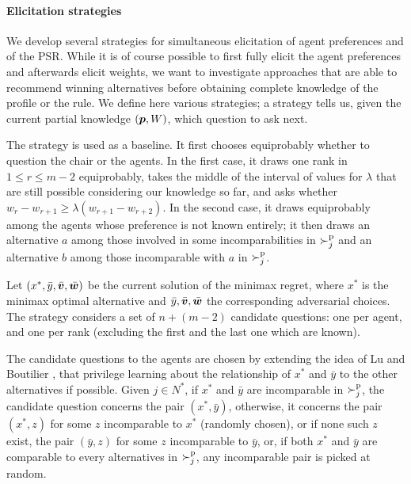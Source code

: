 \documentclass[runningheads]{llncs}
\theoremstyle{remark}
\begin{document}
\paragraph{Elicitation strategies}
We develop several strategies for simultaneous elicitation of agent preferences and of the PSR.
While it is of course possible to first fully elicit the agent preferences and afterwards elicit weights, we want to investigate approaches that are able to recommend winning alternatives before obtaining complete knowledge of the profile or the rule.
We define here various strategies; %
a strategy tells us, given the current partial knowledge $({\bm{p}}, W)$, which question to ask next.

The  strategy is used as a baseline. %
It first chooses equiprobably whether to question the chair or the agents. In the first case, it draws one rank in $1 ≤ r ≤ m-2$ equiprobably, takes the middle of the interval of values for $\lambda$ that are still possible considering our knowledge so far, and asks whether $w_r - w_{r+1} ≥ \lambda (w_{r+1} - w_{r+2})$.
In the second case, it draws equiprobably among the agents whose preference is not known entirely; it then draws an alternative $a$ among those involved in some incomparabilities in $\succ^\text{p}_j$ and an alternative $b$ among those incomparable with $a$ in $\succ^\text{p}_j$.

Let $(x^{*},\bar{y}, \bar{\bm{v}}, \bar{\bm{w}})$ be the current solution of the minimax regret, where $x^{*}$ is the minimax optimal alternative and $\bar{y}, \bar{\bm{v}}, \bar{\bm{w}}$ the corresponding adversarial choices. 
The  strategy considers a set of $n + (m-2)$ candidate questions: one per agent, and one per rank (excluding the first and the last one which are known).

The candidate questions to the agents are chosen by extending the idea of Lu and Boutilier \cite{Lu2011}, that privilege learning about the relationship of $x^*$ and $\bar{y}$ to the other alternatives if possible.
Given $j \in N^*$, if $x^*$ and $\bar{y}$ are incomparable in $\succ^\text{p}_j$, the candidate question concerns the pair $(x^*, \bar{y})$, otherwise, %
it concerns the pair $(x^*, z)$ for some $z$ incomparable to $x^*$ (randomly chosen), or if none such $z$ exist, the pair $(\bar{y}, z)$ for some $z$ incomparable to $\bar{y}$, or, if both $x^*$ and $\bar{y}$ are comparable to every alternatives in $\succ^\text{p}_j$, any incomparable pair is picked at random. 
\end{document}
